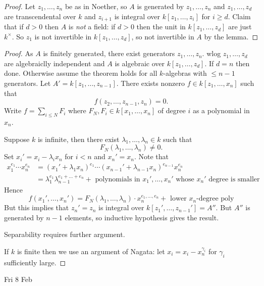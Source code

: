 \documentclass[a4paper]{article}
\begin{document}
\begin{proof}
  Let \(z_1, \dots, z_n\) be as in Noether, so \(A\) is generated by \(z_1, \dots, z_n\) and \(z_1, \dots, z_d\) are transcendental over \(k\) and \(z_{i + 1}\) is integral over \(k[z_1, \dots, z_i]\) for \(i \geq d\). Claim that if \(d > 0\) then \(A\) is \emph{not} a field: if \(d > 0\) then the unit in \(k[z_1, \dots, z_d]\) are just \(k^\times\). So \(z_1\) is not invertible in \(k[z_1, \dots, z_d]\), so not invertible in \(A\) by the lemma.
\end{proof}

\begin{proof}
  As \(A\) is finitely generated, there exist generators \(z_1, \dots, z_n\). wlog \(z_1, \dots, z_d\) are algebraiclly independent and \(A\) is algebraic over \(k[z_1, \dots, z_d]\). If \(d = n\) then done. Otherwise assume the theorem holds for all \(k\)-algebras with \(\leq n - 1\) generators. Let \(A' = k[z_1, \dots, z_{n - 1}]\). There exists nonzero \(f \in k[z_1, \dots, x_n]\) such that
  \[
    f(z_2, \dots, z_{n - 1}, z_n) = 0.
  \]
  Write \(f = \sum_{i \leq N} F_i\) where \(F_N, F_i \in k[x_1, \dots, x_n]\) of degree \(i\) as a polynomial in \(x_n\).

  Suppose \(k\) is infinite, then there exist \(\lambda_1, \dots, \lambda_n \in k\) such that
  \[
    F_N(\lambda_1, \dots, \lambda_n) \neq 0.
  \]
  Set \(x_i' = x_i - \lambda_i x_n\) for \(i < n\) and \(x_n' = x_n\). Note that
  \begin{align*}
    x_1^{e_1} \cdots x_n^{e_n}
    &= (x_1' + \lambda_1 x_n)^{e_1} \cdots (x_{n - 1}' + \lambda_{n - 1} x_n)^{e_{n - 1}} x_n^{e_n} \\
    &= \lambda_1^{e_1} \lambda_{n - 1}^{e_1 + \dots + e_n} + \text{ polynomials in \(x_1', \dots, x_n'\) whose \(x_n'\) degree is smaller}
  \end{align*}
  Hence
  \[
    f(x_1', \dots, x_n') = F_N(\lambda_1, \dots, \lambda_n) \cdot x_n^{e_1, \dots, e_n} + \text{ lower \(x_n\)-degree poly}
  \]
  But this implies that \(z_n' = z_n\) is integral over \(k[z_1', \dots, z_{n - 1}'] = A''\). But \(A''\) is generated by \(n - 1\) elements, so inductive hypothesis gives the result.

  Separability requires further argument.

  If \(k\) is finite then we use an argument of Nagata: let \(x_i = x_i - x_n^{\gamma_i}\) for \(\gamma_i\) sufficiently large.
\end{proof}

Fri 8 Feb
\end{document}
